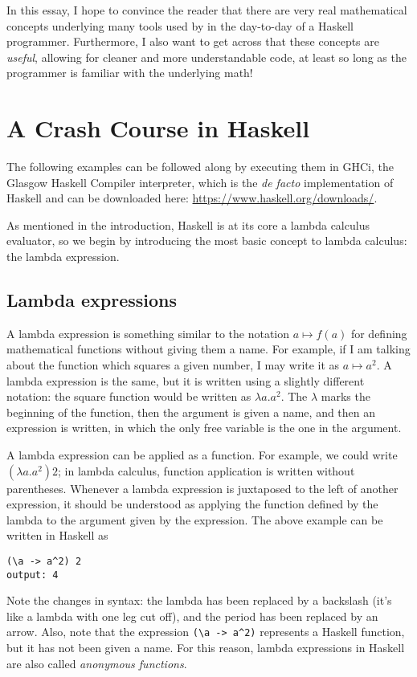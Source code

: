 \documentclass[11pt]{article}
\theoremstyle{nonumberplain}
\begin{document}
In this essay, I hope to convince the reader that there are very real mathematical concepts underlying many tools used by in the day-to-day of a Haskell programmer. Furthermore, I also want to get across that these concepts are \emph{useful}, allowing for cleaner and more understandable code, at least so long as the programmer is familiar with the underlying math!

\section{A Crash Course in Haskell}

The following examples can be followed along by executing them in GHCi, the Glasgow Haskell Compiler interpreter, which is the \textit{de facto} implementation of Haskell and can be downloaded here: \url{https://www.haskell.org/downloads/}.

As mentioned in the introduction, Haskell is at its core a lambda calculus evaluator, so we begin by introducing the most basic concept to lambda calculus: the lambda expression.

\subsection{Lambda expressions}

A lambda expression is something similar to the notation $a \mapsto f(a)$ for defining mathematical functions without giving them a name. For example, if I am talking about the function which squares a given number, I may write it as $a \mapsto a^2$. A lambda expression is the same, but it is written using a slightly different notation: the square function would be written as $\lambda a. a^2$. The $\lambda$ marks the beginning of the function, then the argument is given a name, and then an expression is written, in which the only free variable is the one in the argument.

A lambda expression can be applied as a function. For example, we could write $(\lambda a. a^2) 2$; in lambda calculus, function application is written without parentheses. Whenever a lambda expression is juxtaposed to the left of another expression, it should be understood as applying the function defined by the lambda to the argument given by the expression. The above example can be written in Haskell as
\begin{lstlisting}
(\a -> a^2) 2
output: 4
\end{lstlisting}

Note the changes in syntax: the lambda has been replaced by a backslash (it's like a lambda with one leg cut off), and the period has been replaced by an arrow. Also, note that the expression \lstinline|(\a -> a^2)| represents a Haskell function, but it has not been given a name. For this reason, lambda expressions in Haskell are also called \emph{anonymous functions}.
\end{document}
